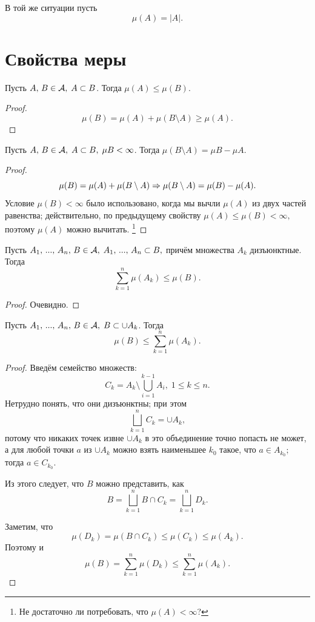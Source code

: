 \documentclass{notes}
\begin{document}
	\begin{exm}
		В той же ситуации пусть
		\[
			\mu(A) = |A|.
		\]
	\end{exm}

\section{Свойства меры}
	
	\begin{pr}[Монотонность]
		Пусть $A, \, B \in \mathcal{A}, \; A \subset B$. Тогда $\mu(A) \leqslant \mu(B)$.
		\begin{proof}
			\[
				\mu(B) = \mu(A) + \mu(B \setminus A) \geqslant \mu(A).
			\]
		\end{proof}
	\end{pr}

	\begin{pr}
		Пусть $A, \, B \in \mathcal{A}, \; A \subset B, \; \mu{B} < \infty$. Тогда $\mu(B \setminus A) = \mu{B} - \mu{A}$.
		\begin{proof}
			\[
				\mu(B) = \mu(A) + \mu(B \setminus A) \Rightarrow \mu(B \setminus A) = \mu(B) - \mu(A).
			\]
			Условие $\mu(B) < \infty$ было использовано, когда мы вычли $\mu(A)$ из двух частей равенства; действительно, по предыдущему свойству $\mu(A) \leqslant \mu(B) < \infty,$ поэтому $\mu(A)$ можно вычитать. \footnote{Не достаточно ли потребовать, что $\mu(A) < \infty$?}
		\end{proof}
	\end{pr}

	\begin{pr}
		Пусть $A_1, \, ..., \, A_n, \, B \in \mathcal{A}, \; A_1, \, ..., \, A_n \subset B,$ причём множества $A_k$ дизъюнктные. Тогда 
		\[
			\sum\limits_{k = 1}^n \mu(A_k) \leqslant \mu(B).
		\] 
		\begin{proof}
			Очевидно.
		\end{proof}
	\end{pr}

	\begin{pr}[Полуаддитивность]
		Пусть $A_1, \, ..., \, A_n, \, B \in \mathcal{A}, \; B \subset \cup A_k$. Тогда
		\[
			\mu(B) \leqslant \sum\limits_{k = 1}^n \mu(A_k).
		\]
		\begin{proof}
			Введём семейство множеств:
			\[
				C_{k} = A_{k} \setminus \bigcup_{i = 1}^{k - 1} A_i, \; 1 \leqslant k \leqslant n.
			\]
			Нетрудно понять, что они дизъюнктны; при этом 
			\[
				\bigsqcup\limits_{k = 1}^n C_{k} = \cup A_k,
			\]
			потому что никаких точек извне $\cup A_k$ в это объединение точно попасть не может, а для любой точки $a$ из $\cup A_k$ можно взять наименьшее $k_0$ такое, что $a \in A_{k_0};$ тогда $a \in C_{k_0}$. 

			Из этого следует, что $B$ можно представить, как
			\[
				B = \bigsqcup \limits_{k = 1}^n B \cap C_k = \bigsqcup \limits_{k = 1}^n D_k.
			\]

			Заметим, что 
			\[
				\mu(D_k) = \mu(B \cap C_k) \leqslant \mu(C_k) \leqslant \mu(A_k).
			\]
			Поэтому и
			\[
				\mu(B) = \sum\limits_{k = 1}^n \mu(D_k) \leqslant \sum\limits_{k = 1}^n \mu(A_k).
			\]
		\end{proof}
	\end{pr}
\end{document}
